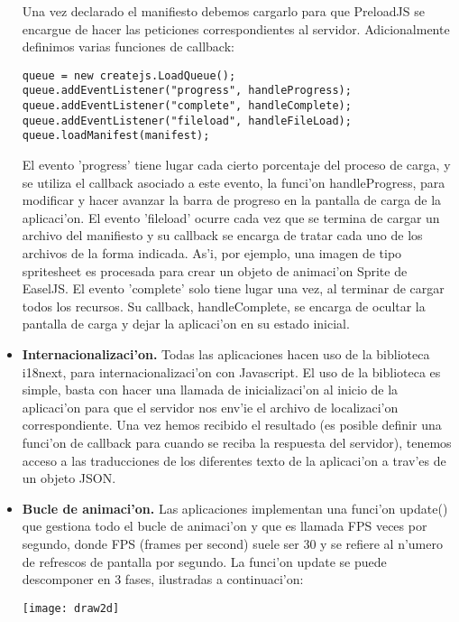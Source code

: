 \begin{itemize}
Una vez declarado el manifiesto debemos cargarlo para que PreloadJS se encargue de hacer las peticiones 
correspondientes al servidor. Adicionalmente definimos varias funciones de callback:

\begin{verbatim}
queue = new createjs.LoadQueue();
queue.addEventListener("progress", handleProgress);
queue.addEventListener("complete", handleComplete);
queue.addEventListener("fileload", handleFileLoad);
queue.loadManifest(manifest);
\end{verbatim}

El evento 'progress' tiene lugar cada cierto porcentaje del proceso de carga, y se utiliza el callback asociado a 
este evento, la funci'on handleProgress, para modificar y hacer avanzar la barra de progreso en la pantalla de carga
de la aplicaci'on.
El evento 'fileload' ocurre cada vez que se termina de cargar un archivo del manifiesto y su callback se encarga de
tratar cada uno de los archivos de la forma indicada. As'i, por ejemplo, una imagen de tipo spritesheet es procesada 
para crear un objeto de animaci'on Sprite de EaselJS.
El evento 'complete' solo tiene lugar una vez, al terminar de cargar todos los recursos. Su callback, handleComplete,
se encarga de ocultar la pantalla de carga y dejar la aplicaci'on en su estado inicial.
\item \textbf{Internacionalizaci'on.} Todas las aplicaciones hacen uso de la biblioteca i18next, para internacionalizaci'on
con Javascript. El uso de la biblioteca es simple, basta con hacer una llamada de inicializaci'on al inicio de la
aplicaci'on para que el servidor nos env'ie el archivo de localizaci'on correspondiente. Una vez hemos recibido el
resultado (es posible definir una funci'on de callback para cuando se reciba la respuesta del servidor), tenemos 
acceso a las traducciones de los diferentes texto de la aplicaci'on a trav'es de un objeto JSON.
\item \textbf{Bucle de animaci'on.} Las aplicaciones implementan una funci'on update() que gestiona todo el bucle de 
animaci'on y que es llamada FPS veces por segundo, donde FPS (frames per second) suele ser 30 y se refiere al n'umero
de refrescos de pantalla por segundo.
La funci'on update se puede descomponer en 3 fases, ilustradas a continuaci'on:

\begin{center}
\texttt{[image: draw2d]}
\end{center}


\end{itemize}
